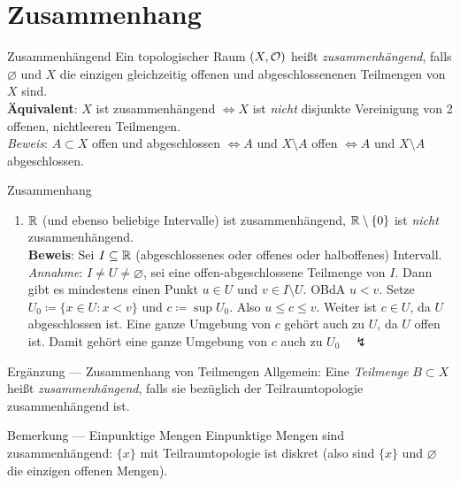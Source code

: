 \section{Zusammenhang}

\begin{definition}{Zusammenhängend}
  Ein topologischer Raum $ (X, \mathcal{O}) $ heißt \emph{zusammenhängend}, falls $ \varnothing $ und $ X $ die einzigen gleichzeitig offenen und abgeschlossenenen Teilmengen von $ X $ sind. \\
  \textbf{Äquivalent}: $ X $ ist zusammenhängend $ \Leftrightarrow X $ ist \emph{nicht} disjunkte Vereinigung von 2 offenen, nichtleeren Teilmengen. \\
  \emph{Beweis}: $ A \subset X $ offen und abgeschlossen $ \Leftrightarrow A $ und $ X \setminus A $ offen $ \Leftrightarrow A $ und $ X \setminus A $ abgeschlossen.
\end{definition}

\begin{example}{Zusammenhang}
  \begin{enumerate}
    \item $ \mathbb{R} $ (und ebenso beliebige Intervalle) ist zusammenhängend, $ \mathbb{R} \setminus \{ 0 \} $ ist \emph{nicht} zusammenhängend. \\
      \textbf{Beweis}: Sei $ I \subseteq \mathbb{R} $ (abgeschlossenes oder offenes oder halboffenes) Intervall. \\
      \emph{Annahme}: $ I \neq U \neq \varnothing $, sei eine offen-abgeschlossene Teilmenge von $ I $. Dann gibt es mindestens einen Punkt $ u \in U $ und $ v \in I \setminus U $. OBdA $ u < v $. Setze $ U_0 \coloneqq \{ x \in U : x < v \} $ und $ c \coloneqq \sup U_0 $. Also $ u \leq c \leq v $. Weiter ist $ c \in U $, da $ U $ abgeschlossen ist. Eine ganze Umgebung von $ c $ gehört auch zu $ U $, da $ U $ offen ist. Damit gehört eine ganze Umgebung von $ c $ auch zu $ U_0 \quad \lightning $
  \end{enumerate}
\end{example}

\begin{bla}{Ergänzung --- Zusammenhang von Teilmengen}
  Allgemein: Eine \emph{Teilmenge} $ B \subset X $ heißt \emph{zusammenhängend}, falls sie bezüglich der Teilraumtopologie zusammenhängend ist.
\end{bla}

\begin{bla}{Bemerkung --- Einpunktige Mengen}
  Einpunktige Mengen sind zusammenhängend: $ \{ x \} $ mit Teilraumtopologie ist diskret (also sind $ \{ x \} $ und $ \varnothing $ die einzigen offenen Mengen).
\end{bla}

